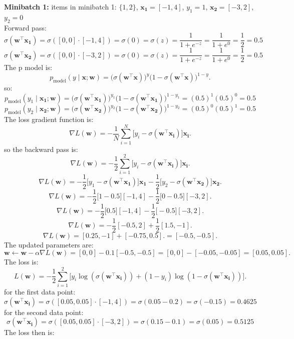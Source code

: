 \documentclass[a3paper,12pt]{article} %
\begin{document}
\textbf{Minibatch 1:}
items in minibatch 1: \(\{1, 2\}\), \(\mathbf{x_1} = [-1, 4]\), \(y_1 = 1\), \(\mathbf{x_2} = [-3, 2]\), \(y_2 = 0\)
\\ Forward pass:
\[
\sigma(\mathbf{w}^\top \mathbf{x_1}) = \sigma([0, 0] \cdot [-1, 4]) = \sigma(0) = \sigma(z) = \frac{1}{1 + e^{-z}} = \frac{1}{1 + e^{0}} = \frac{1}{2} = 0.5
\]
\[
\sigma(\mathbf{w}^\top \mathbf{x_2}) = \sigma([0, 0] \cdot [-3, 2]) = \sigma(0) = \sigma(z) = \frac{1}{1 + e^{-z}} = \frac{1}{1 + e^{0}} = \frac{1}{2} = 0.5
\]
The p model is:
\[
p_{\text{model}}(y \mid \mathbf{x}; \mathbf{w}) = \big(\sigma(\mathbf{w}^\top \mathbf{x})\big)^y \big(1 - \sigma(\mathbf{w}^\top \mathbf{x})\big)^{1-y}.
\]
so:
\[
p_{\text{model}}(y_1 \mid \mathbf{x_1}; \mathbf{w}) = \big(\sigma(\mathbf{w}^\top \mathbf{x_1})\big)^{y_1} \big(1 - \sigma(\mathbf{w}^\top \mathbf{x_1})\big)^{1-y_1} = (0.5)^1 (0.5)^0 = 0.5
\]
\[
p_{\text{model}}(y_2 \mid \mathbf{x_2}; \mathbf{w}) = \big(\sigma(\mathbf{w}^\top \mathbf{x_2})\big)^{y_2} \big(1 - \sigma(\mathbf{w}^\top \mathbf{x_2})\big)^{1-y_2} = (0.5)^0 (0.5)^1 = 0.5
\]
The loss gradient function is:
\[
\nabla L(\mathbf{w}) = -\frac{1}{N} \sum^N_{i=1} \big[y_i - \sigma(\mathbf{w}^\top \mathbf{x_i})\big] \mathbf{x_i}.
\]
so the backward pass is:
\[
\nabla L(\mathbf{w}) = -\frac{1}{2} \sum^2_{i=1} \big[y_i - \sigma(\mathbf{w}^\top \mathbf{x_i})\big] \mathbf{x_i}.
\]
\[
\nabla L(\mathbf{w}) = -\frac{1}{2} \big[y_1 - \sigma(\mathbf{w}^\top \mathbf{x_1})\big] \mathbf{x_1} - \frac{1}{2} \big[y_2 - \sigma(\mathbf{w}^\top \mathbf{x_2})\big] \mathbf{x_2}.
\]
\[
\nabla L(\mathbf{w}) = -\frac{1}{2} \big[1 - 0.5\big] [-1, 4] - \frac{1}{2} \big[0 - 0.5\big] [-3, 2].
\]
\[
\nabla L(\mathbf{w}) = -\frac{1}{2} \big[0.5\big] [-1, 4] - \frac{1}{2} \big[-0.5\big] [-3, 2].
\]
\[
\nabla L(\mathbf{w}) = -\frac{1}{2} [-0.5, 2] + \frac{1}{2} [1.5, -1].
\]
\[
\nabla L(\mathbf{w}) = [0.25, -1] + [-0.75, 0.5]. = [-0.5, -0.5].
\]  
The updated parameters are:
\[
\mathbf{w} \gets \mathbf{w} - \alpha \nabla L(\mathbf{w}) = [0, 0] - 0.1 [-0.5, -0.5] = [0, 0] - [-0.05, -0.05] = [0.05, 0.05].
\]
The loss is:
\[
L(\mathbf{w}) = -\frac{1}{2} \sum^2_{i=1} \big[y_i \log(\sigma(\mathbf{w}^\top \mathbf{x_i})) + (1-y_i) \log(1-\sigma(\mathbf{w}^\top \mathbf{x_i}))\big].
\]
for the first data point:
\[
    \sigma(\mathbf{w}^\top \mathbf{x_i}) = \sigma([0.05, 0.05] \cdot [-1, 4]) = \sigma(0.05 - 0.2) = \sigma(-0.15) = 0.4625
\]
for the second data point:
\[
    \sigma(\mathbf{w}^\top \mathbf{x_i}) = \sigma([0.05, 0.05] \cdot [-3, 2]) = \sigma(0.15 - 0.1) = \sigma(0.05) = 0.5125
\]
The loss then is:
\end{document}
